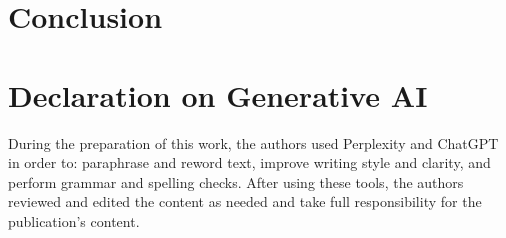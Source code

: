 \documentclass[
]{ceurart}
\begin{document}

\section{Conclusion}

\begin{acknowledgments}

\end{acknowledgments}

\section*{Declaration on Generative AI}

During the preparation of this work, the authors used Perplexity and
ChatGPT in order to: paraphrase and reword text, improve writing
style and clarity, and perform grammar and spelling checks. After using these
tools, the authors reviewed and edited the content as needed and take
full responsibility for the publication’s content.




\appendix


\end{document}
